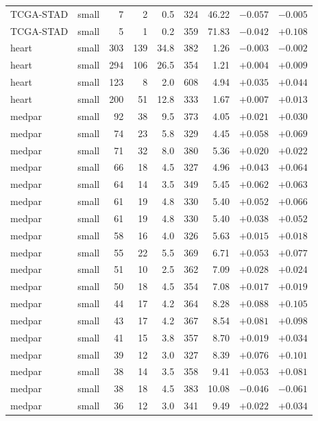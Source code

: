 \begin{longtable}{@{}llrrrrrrr@{}}
TCGA-STAD & small & 7 & 2 & 0.5 & 324 & 46.22 & $-0.057$ & $-0.005$\\
TCGA-STAD & small & 5 & 1 & 0.2 & 359 & 71.83 & $-0.042$ & $+0.108$\\
heart & small & 303 & 139 & 34.8 & 382 & 1.26 & $-0.003$ & $-0.002$\\
heart & small & 294 & 106 & 26.5 & 354 & 1.21 & $+0.004$ & $+0.009$\\
heart & small & 123 & 8 & 2.0 & 608 & 4.94 & $+0.035$ & $+0.044$\\
heart & small & 200 & 51 & 12.8 & 333 & 1.67 & $+0.007$ & $+0.013$\\
medpar & small & 92 & 38 & 9.5 & 373 & 4.05 & $+0.021$ & $+0.030$\\
medpar & small & 74 & 23 & 5.8 & 329 & 4.45 & $+0.058$ & $+0.069$\\
medpar & small & 71 & 32 & 8.0 & 380 & 5.36 & $+0.020$ & $+0.022$\\
medpar & small & 66 & 18 & 4.5 & 327 & 4.96 & $+0.043$ & $+0.064$\\
medpar & small & 64 & 14 & 3.5 & 349 & 5.45 & $+0.062$ & $+0.063$\\
medpar & small & 61 & 19 & 4.8 & 330 & 5.40 & $+0.052$ & $+0.066$\\
medpar & small & 61 & 19 & 4.8 & 330 & 5.40 & $+0.038$ & $+0.052$\\
medpar & small & 58 & 16 & 4.0 & 326 & 5.63 & $+0.015$ & $+0.018$\\
medpar & small & 55 & 22 & 5.5 & 369 & 6.71 & $+0.053$ & $+0.077$\\
medpar & small & 51 & 10 & 2.5 & 362 & 7.09 & $+0.028$ & $+0.024$\\
medpar & small & 50 & 18 & 4.5 & 354 & 7.08 & $+0.017$ & $+0.019$\\
medpar & small & 44 & 17 & 4.2 & 364 & 8.28 & $+0.088$ & $+0.105$\\
medpar & small & 43 & 17 & 4.2 & 367 & 8.54 & $+0.081$ & $+0.098$\\
medpar & small & 41 & 15 & 3.8 & 357 & 8.70 & $+0.019$ & $+0.034$\\
medpar & small & 39 & 12 & 3.0 & 327 & 8.39 & $+0.076$ & $+0.101$\\
medpar & small & 38 & 14 & 3.5 & 358 & 9.41 & $+0.053$ & $+0.081$\\
medpar & small & 38 & 18 & 4.5 & 383 & 10.08 & $-0.046$ & $-0.061$\\
medpar & small & 36 & 12 & 3.0 & 341 & 9.49 & $+0.022$ & $+0.034$\\

\end{longtable}
